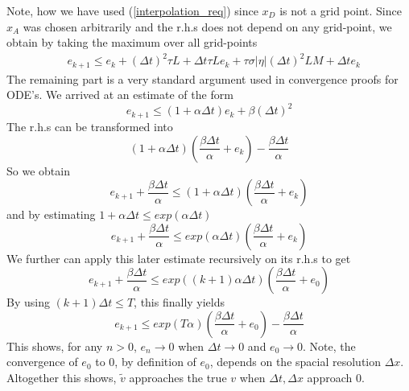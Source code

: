 \documentclass[17pt]{extarticle}
\begin{document}
Note, how we have used (\ref{interpolation_req}) since $x_D$ is not a grid point.
Since $x_A$ was chosen arbitrarily and the r.h.s does not depend on any grid-point, we obtain by taking the maximum over all grid-points
\begin{align*}
	&e_{k+1}\leq
	e_k+
	(\Delta t)^2\tau L
	+ \Delta t \tau L
		e_k+\tau\sigma|\eta|(\Delta t)^2 LM+
	\Delta t e_k
\end{align*} 
The remaining part is a very standard argument used in convergence proofs for ODE's.
We arrived at an estimate of the form
$$
e_{k+1}\leq(1+\alpha\Delta t)e_k+\beta(\Delta t)^2
$$
The r.h.s can be transformed into
$$
\left(1+\alpha\Delta t\right)\left(\frac{\beta\Delta t}{\alpha}+e_k\right)-\frac{\beta\Delta t}{\alpha}
$$
So we obtain
$$
e_{k+1}+\frac{\beta\Delta t}{\alpha}\leq 
\left(1+\alpha\Delta t\right)\left(\frac{\beta\Delta t}{\alpha}+e_k\right)
$$
and by estimating $1+\alpha\Delta t\leq exp(\alpha\Delta t)$
$$
e_{k+1}+\frac{\beta\Delta t}{\alpha}\leq 
exp(\alpha\Delta t)\left(\frac{\beta\Delta t}{\alpha}+e_k\right)
$$
We further can apply this later estimate recursively on its r.h.s to get
$$
e_{k+1}+\frac{\beta\Delta t}{\alpha}\leq 
exp((k+1)\alpha\Delta t)\left(\frac{\beta\Delta t}{\alpha}+e_0\right)
$$
By using $(k+1)\Delta t\leq T$, this finally yields
$$
e_{k+1}\leq 
exp(T\alpha)\left(\frac{\beta\Delta t}{\alpha}+e_0\right)-\frac{\beta\Delta t}{\alpha}
$$
This shows, for any $n>0$, $e_{n}\rightarrow 0$ when $\Delta t\rightarrow 0$ and $e_0\rightarrow 0$. Note, the convergence of $e_0$ to $0$, by definition of $e_{0}$,
depends on the spacial resolution $\Delta x$.
Altogether this shows, $\tilde{v}$ approaches the true $v$ when $\Delta t, \Delta x$ approach $0$. 
\end{document}
